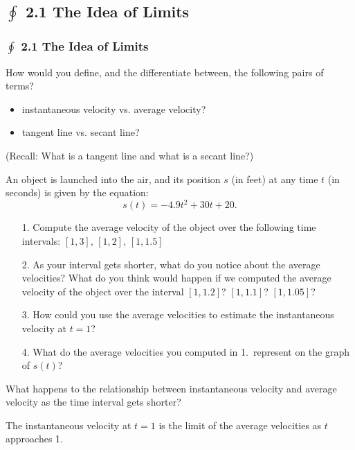 \documentclass[14pt]{beamer}
\begin{document}
\begin{frame}
\subsection[2.1 The Idea of Limits]{$\oint$ 2.1 The Idea of Limits}
\frametitle{$\oint$ 2.1 The Idea of Limits}
\begin{que} How would you define, and the differentiate between, the following pairs of terms? 
\begin{itemize}
\item instantaneous velocity vs. average velocity?
\item tangent line vs. secant line? 
\end{itemize}
\end{que}

(Recall:  What is a tangent line and what is a secant line?)
\end{frame}

\begin{frame}
\small
An object is launched into the air, and its position $s$ (in feet) at any time $t$ (in seconds) is given by the equation:
\[s(t)=-4.9t^2+30t+20.\]
\begin{itemize}
\item[1.] Compute the average velocity of the object over the following time intervals:  $[1,3],\,[1,2],\,[1,1.5]$
\item[2.] As your interval gets shorter, what do you notice about the average velocities?  What do you think would happen if we computed the average velocity of the object over the interval $[1,1.2]$? $[1,1.1]$? $[1,1.05]$?
\end{itemize}
\end{frame}

\begin{frame}
\begin{itemize}
\item[3.] How could you use the average velocities to estimate the instantaneous velocity at $t=1$?

\vspace{2pc}
\item[4.] What do the average velocities you computed in 1.\ represent on the graph of $s(t)$?
\end{itemize}
\end{frame}

\begin{frame}
\begin{que} What happens to the relationship between instantaneous velocity and average velocity as the time interval gets shorter? \end{que}

\vspace{2pc}
\pause 
The instantaneous velocity at $t=1$ is the limit of the average velocities as $t$ approaches 1.
\end{frame}
\end{document}
